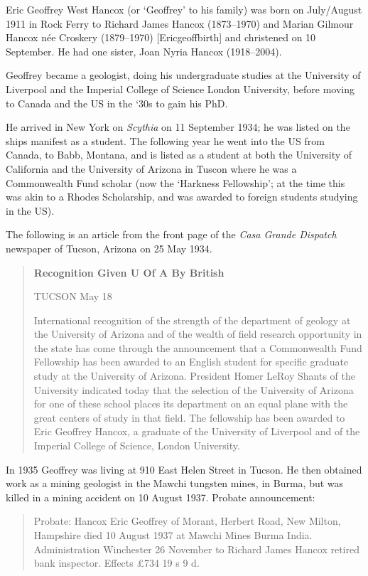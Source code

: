 
Eric Geoffrey West Hancox (or `Geoffrey' to his family) was  born on July/August 1911 in Rock Ferry to Richard James Hancox (1873--1970) and Marian Gilmour Hancox n\'{e}e Croskery (1879--1970) [Ericgeoffbirth] and christened on 10 September.\cite{EGWHchristening} He had one sister, Joan Nyria Hancox (1918--2004).

Geoffrey became a geologist, doing his undergraduate studies at the University of Liverpool and the Imperial College of Science London University, before moving to Canada and the US in the `30s to gain his PhD.

He arrived in New York on \emph{Scythia} on 11 September 1934; he was listed on the ships manifest as a student.\cite{NYpassengers}
The following year he went into the US from Canada, to Babb, Montana, and is listed as a student at both the University of California
and the University of Arizona in Tuscon\cite{USCanadaBorderCrossings} where he was a Commonwealth Fund scholar
(now the `Harkness Fellowship'; at the time this was akin to a Rhodes Scholarship, and was awarded to foreign students studying in the US).

The following is an article from the front page of the \emph{Casa Grande Dispatch} newspaper of Tucson, Arizona on 25 May 1934.\cite{CasaP1}

\begin{quotation}
\textbf{Recognition Given U Of A By British}

TUCSON May 18

International recognition of the strength of the department of geology at the University of Arizona and of the wealth of field research opportunity in the state has come through the announcement that a Commonwealth Fund Fellowship has been awarded to an English student for specific graduate study at the University of Arizona. President Homer LeRoy Shants of the University indicated today that the selection of the University of Arizona for one of these school places its department on an equal plane with the great centers of study in that field. The fellowship has been awarded to Eric Geoffrey Hancox, a graduate of the University of Liverpool and of the Imperial College of Science, London University.
\end{quotation}

In 1935 Geoffrey was living at 910 East Helen Street in Tucson.\cite{USCities}
He then obtained work as a mining geologist in  the Mawchi tungsten mines, in Burma, but was killed in a mining accident on 10 August 1937.
Probate announcement:\cite{EGWHprobate}
\begin{quotation}
Probate: Hancox Eric Geoffrey of Morant, Herbert Road, New Milton, Hampshire died 10 August 1937 at Mawchi Mines Burma India. Administration Winchester 26 November to Richard James Hancox retired bank inspector. Effects \pounds734 19 s 9 d.
\end{quotation}
